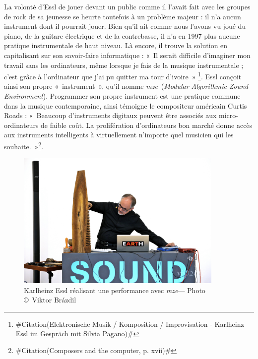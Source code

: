 \documentclass[a4paper,12pt]{article}
\newcommand{\guill}[1]{«~#1~»}
\newcommand{\zitat}[2]{\#Citation(#2)\#}
\newcommand{\maze}[0]{\emph{m\symbol{64}ze\textdegree2}}
\begin{document}
La volonté d'Essl de jouer devant un public comme il l'avait fait avec les groupes de rock de sa jeunesse se heurte toutefois à un problème majeur : il n'a aucun instrument dont il pourrait jouer. Bien qu'il ait comme nous l'avons vu joué du piano, de la guitare électrique et de la contrebasse, il n'a en 1997 plus aucune pratique instrumentale de haut niveau. Là encore, il trouve la solution en capitalisant sur son savoir-faire informatique : \guill{Il serait difficile d'imaginer mon travail sans les ordinateurs, même lorsque je fais de la musique instrumentale ; c'est grâce à l'ordinateur que j'ai pu quitter ma tour d'ivoire}
\footnote{\zitat{Ohne Computer wäre meine Arbeit schwer vorstellbar, selbst wenn ich Instrumentalmusik mache; dadurch war es mir möglich, aus meinem kompositorischen Elfenbeinturm auszubrechen.}
{Elektronische Musik / Komposition / Improvisation - Karlheinz Essl im Gespräch mit Silvia Pagano}}. Essl conçoit ainsi son propre \guill{instrument}, qu'il nomme \maze~(\emph{Modular Algorithmic Zound Environment}). Programmer son propre instrument est une pratique commune dans la musique contemporaine, ainsi témoigne le compositeur américain Curtis Roads : \guill{Beaucoup d'instruments digitaux peuvent être associés aux micro-ordinateurs de faible coût. La prolifération d'ordinateurs bon marché donne accès aux instruments intelligents à virtuellement n'importe quel musicien qui les souhaite.}\footnote{\zitat{Many digital instruments can be attached to inexpensive personal computers. The proliferation of inexpensive computers puts the capability of intelligent instruments within the reach of virtually every musician who wants them.}
{Composers and the computer, p. xvii}}.

\begin{figure}[h!]
\begin{center}
\includegraphics[width=10cm]{images/performance.jpg}
\caption{\footnotesize Karlheinz Essl réalisant une performance avec \maze --- Photo \copyright~Viktor Br\'azdil}
\label{performancephoto}
\end{center}
\end{figure}
\end{document}
